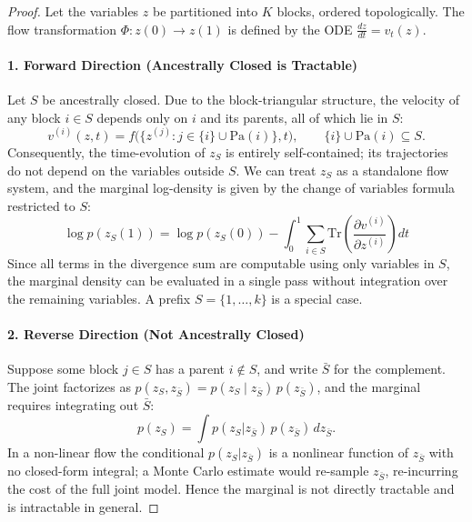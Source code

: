 \begin{proof}
Let the variables $z$ be partitioned into $K$ blocks, ordered topologically. The flow transformation $\Phi: z(0) \to z(1)$ is defined by the ODE $\frac{dz}{dt} = v_t(z)$.

\paragraph{1. Forward Direction (Ancestrally Closed is Tractable)}
Let $S$ be ancestrally closed. Due to the block-triangular structure, the velocity of any block $i \in S$ depends only on $i$ and its parents, all of which lie in $S$:
\begin{equation}
    v^{(i)}(z, t) = f\bigl(\{z^{(j)} : j \in \{i\} \cup \mathrm{Pa}(i)\}, t\bigr), \qquad \{i\}\cup\mathrm{Pa}(i) \subseteq S.
\end{equation}
Consequently, the time-evolution of $z_S$ is entirely self-contained; its trajectories do not depend on the variables outside $S$. We can treat $z_S$ as a standalone flow system, and the marginal log-density is given by the change of variables formula restricted to $S$:
\begin{equation}
    \log p(z_S(1)) = \log p(z_S(0)) - \int_0^1 \sum_{i \in S} \text{Tr}\left(\frac{\partial v^{(i)}}{\partial z^{(i)}}\right) dt
\end{equation}
Since all terms in the divergence sum are computable using only variables in $S$, the marginal density can be evaluated in a single pass without integration over the remaining variables. A prefix $S=\{1,\dots,k\}$ is a special case.

\paragraph{2. Reverse Direction (Not Ancestrally Closed)}
Suppose some block $j \in S$ has a parent $i \notin S$, and write $\bar S$ for the complement. The joint factorizes as $p(z_S, z_{\bar S}) = p(z_S \mid z_{\bar S})\,p(z_{\bar S})$, and the marginal requires integrating out $\bar S$:
\begin{equation}
    p(z_S) = \int p(z_S | z_{\bar S}) \, p(z_{\bar S}) \, d z_{\bar S}.
\end{equation}
In a non-linear flow the conditional $p(z_S | z_{\bar S})$ is a nonlinear function of $z_{\bar S}$ with no closed-form integral; a Monte Carlo estimate would re-sample $z_{\bar S}$, re-incurring the cost of the full joint model. Hence the marginal is not directly tractable and is intractable in general. 
\end{proof}

